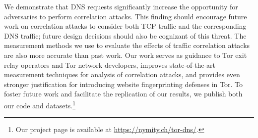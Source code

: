 We demonstrate that DNS requests significantly increase the opportunity
for adversaries to perform correlation attacks. This finding should
encourage future work on correlation attacks to consider both TCP
traffic and the corresponding DNS traffic; future design decisions
should also be cognizant of this threat.  The measurement methods we use
to evaluate the effects of traffic correlation attacks are also more
accurate than past work. Our work \first serves as guidance to Tor exit
relay operators and Tor network developers, \second improves
state-of-the-art measurement techniques for analysis of correlation attacks, and \third
provides even stronger justification for introducing website fingerprinting defenses in
Tor.  To foster future work and facilitate the replication of
our results, we publish both our code and datasets.\footnote{Our project page is
available at \url{https://nymity.ch/tor-dns/}.}

%

%
